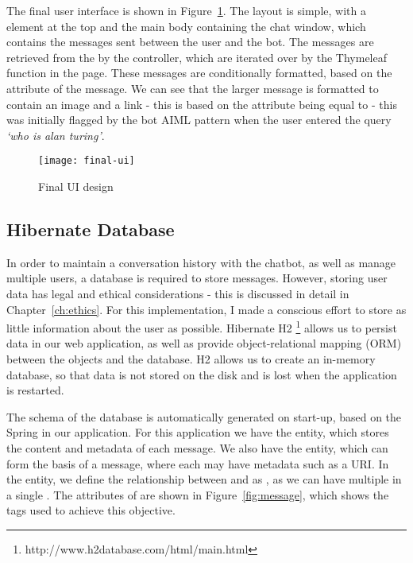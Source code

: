 The final user interface is shown in Figure~\ref{fig:final-ui}. The layout is simple, with a  element at the top and the main body containing the chat window, which contains the messages sent between the user and the bot. The messages are retrieved from the  by the controller, which are iterated over by the Thymeleaf function in the  page. These messages are conditionally formatted, based on the  attribute of the message. We can see that the larger message is formatted to contain an image and a link - this is based on the  attribute being equal to  - this was initially flagged by the bot AIML pattern when the user entered the query {\it`who is alan turing'}.

\begin{figure}[h]
	\centering
	\texttt{[image: final-ui]}
	\caption{Final UI design}
	\label{fig:final-ui}
\end{figure}

\newpage
\subsection{Hibernate Database}
In order to maintain a conversation history with the chatbot, as well as manage multiple users, a database is required to store messages. However, storing user data has legal and ethical considerations - this is discussed in detail in Chapter~\ref{ch:ethics}. For this implementation, I made a conscious effort to store as little information about the user as possible. Hibernate H2 \footnote{http://www.h2database.com/html/main.html} allows us to persist data in our web application, as well as provide object-relational mapping (ORM) between the objects and the database. H2 allows us to create an in-memory database, so that data is not stored on the disk and is lost when the application is restarted.

The schema of the database is automatically generated on start-up, based on the Spring  in our application. For this application we have the  entity, which stores the content and metadata of each message. We also have the  entity, which can form the basis of a  message, where each  may have metadata such as a URI. In the  entity, we define the relationship between  and  as , as we can have multiple  in a single . The attributes of  are shown in Figure~\ref{fig:message}, which shows the tags used to achieve this objective.

